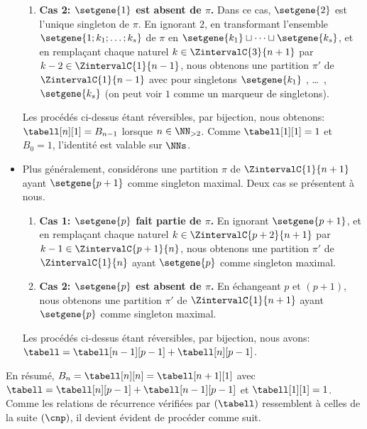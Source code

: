 \begin{itemize}
\begin{enumerate}
    	\item \textbf{\boldmath Cas 2: $\setgene{1}$ est absent de $\pi$.}
        Dans ce cas, $\setgene{2}$ est l'unique singleton de $\pi$.
        En ignorant $2$,
        en transformant l'ensemble $\setgene{1 ; k_1 ; \dots ; k_s}$ de $\pi$ en $\setgene{k_1} \sqcup \dots \sqcup \setgene{k_s}$,
        et
        en remplaçant chaque naturel $k \in \ZintervalC{3}{n+1}$ par $k-2 \in \ZintervalC{1}{n-1}$,
        nous obtenons une partition $\pi'$ de $\ZintervalC{1}{n-1}$ avec pour singletons $\setgene{k_1}$ , \dots\ , $\setgene{k_s}$
        (on peut voir $1$ comme un marqueur de singletons).
    \end{enumerate}
    Les procédés ci-dessus étant réversibles, par bijection, nous obtenons:
    $\tabell[n][1] = B_{n-1}$ lorsque $n \in \NN_{>2}$.
    Comme $\tabell[1][1] = 1$ et $B_0 = 1$, l'identité est valable sur $\NNs$.


    \item Plus généralement, considérons une partition $\pi$ de $\ZintervalC{1}{n+1}$ ayant $\setgene{p+1}$ comme singleton maximal.
    Deux cas se présentent à nous.
    \begin{enumerate}
        \item \textbf{\boldmath Cas 1: $\setgene{p}$ fait partie de $\pi$.}
        En ignorant $\setgene{p+1}$, 
        et
        en remplaçant chaque naturel $k \in \ZintervalC{p+2}{n+1}$ par $k-1 \in \ZintervalC{p+1}{n}$,
        nous obtenons une partition $\pi'$ de $\ZintervalC{1}{n}$ ayant $\setgene{p}$ comme singleton maximal.


        \item \textbf{\boldmath Cas 2: $\setgene{p}$ est absent de $\pi$.}
        En échangeant $p$ et $(p+1)$,
        nous obtenons une partition $\pi'$ de $\ZintervalC{1}{n+1}$ ayant $\setgene{p}$ comme singleton maximal. 
    \end{enumerate}
    Les procédés ci-dessus étant réversibles, par bijection, nous avons:
    $\tabell = \tabell[n-1][p-1] +  \tabell[n][p-1]$.
\end{itemize}


En résumé,
$B_n = \tabell[n][n] = \tabell[n+1][1]$
avec
$\tabell = \tabell[n][p-1] + \tabell[n-1][p-1]$
et
$\tabell[1][1] = 1$. 
%
Comme les relations de récurrence vérifiées par $(\tabell)$ ressemblent à celles de la suite $(\cnp)$,
il devient évident de procéder comme suit.

